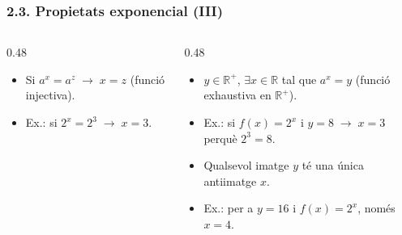 \documentclass[aspectratio=169]{beamer}
\begin{document}
\begin{frame}[t]
  \frametitle{2.3. Propietats exponencial (III)}

  \vspace{-0.12cm}
  \small
  \setlength{\itemsep}{0.06em}
  \setlength{\topsep}{0.06em}

  \begin{columns}[T,onlytextwidth]
    \begin{column}{0.48\textwidth}
      \begin{itemize}
        \item<1-> Si \(a^x=a^z \;\rightarrow\; x=z\) (funció injectiva).
        \item<2-> Ex.: si \(2^x=2^3 \;\rightarrow\; x=3\).
      \end{itemize}

      \vspace{0.15cm}
    \end{column}

    \begin{column}{0.48\textwidth}
      \begin{itemize}
        \item<7-> \(y\in\mathbb{R}^+\), \(\exists x\in\mathbb{R}\) tal que \(a^x=y\) (funció exhaustiva en \(\mathbb{R}^+\)).
        \item<8-> Ex.: si \(f(x)=2^x\) i \(y=8 \;\rightarrow\; x=3\) perquè \(2^3=8\).
        \item<9-> Qualsevol imatge \(y\) té una única antiimatge \(x\).
        \item<10-> Ex.: per a \(y=16\) i \(f(x)=2^x\), només \(x=4\).
      \end{itemize}


\end{column}
\end{columns}
\end{frame}
\end{document}

